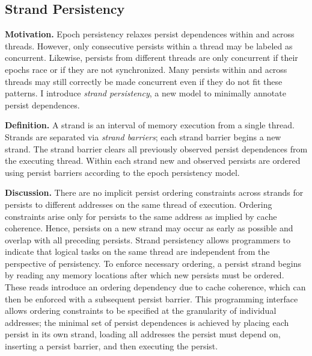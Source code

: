 \subsection{Strand Persistency}
\label{section:PersistencyModels:PersistStrands}

\textbf{Motivation.}
Epoch persistency relaxes persist dependences within and across threads.
However, only consecutive persists within a thread may be labeled as concurrent.
Likewise, persists from different threads are only concurrent if their epochs race or if they are not synchronized.
Many persists within and across threads may still correctly be made concurrent even if they do not fit these patterns.
I introduce \emph{strand persistency}, a new model to minimally annotate persist dependences.

\textbf{Definition.}
A strand is an interval of memory execution from a single thread.
Strands are separated via \emph{strand barriers}; each strand barrier begins a new strand.
The strand barrier clears all previously observed persist dependences from the executing thread.
Within each strand new and observed persists are ordered using persist barriers according to the epoch persistency model.

\textbf{Discussion.}
There are no implicit persist ordering constraints across strands for persists to different addresses on the same thread of execution.
Ordering constraints arise only for persists to the same address as implied by cache coherence.
Hence, persists on a new strand may occur as early as possible and overlap with all preceding persists.
Strand persistency allows programmers to indicate that logical tasks on the same thread are independent from the perspective of persistency.
To enforce necessary ordering, a persist strand begins by reading any memory locations after which new persists must be ordered.
These reads introduce an ordering dependency due to cache coherence, which can then be enforced with a subsequent persist barrier.
This programming interface allows ordering constraints to be specified at the granularity of individual addresses; the minimal set of persist dependences is achieved by placing each persist in its own strand, loading all addresses the persist must depend on, inserting a persist barrier, and then executing the persist.

